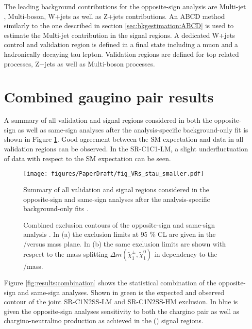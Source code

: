 The leading background contributions for the opposite-sign analysis are Multi-jet , Multi-boson, W+jets as well as Z+jets contributions. 
An ABCD method similarly to the one described in section \ref{sec:bkgestimation:ABCD} is used to estimate the Multi-jet contribution in the signal regions.  A dedicated W+jets control and validation region is defined in a final state including a muon and a hadronically decaying tau lepton.  Validation regions are defined for top related processes, Z+jets as well as Multi-boson processes. 

\section{Combined gaugino pair results}
\label{sec:analysis:combination}
A summary of all validation and signal regions considered in both the opposite-sign as well as same-sign analyses after the analysis-specific background-only fit is shown in Figure \ref{fig:analysis:osssregions}. Good agreement between the \ac{SM} expectation and data in all validation regions can be observed.  In the SR-C1C1-LM,  a slight underfluctuation of data with respect to the \ac{SM} expectation can be seen.

\begin{figure}[htpb!]
\centering
\texttt{[image: figures/PaperDraft/fig\_VRs\_stau\_smaller.pdf]}
\caption{Summary of all validation and signal regions considered in the opposite-sign and same-sign analyses after the analysis-specific background-only fits \label{fig:analysis:osssregions} \cite{DiTauConfNote2022}. }
\end{figure}

\begin{figure}[htpb!]\centering
{}
\caption{Combined exclusion contours of the opposite-sign and same-sign analysis \cite{DiTauConfNote2022}.  In (a) the exclusion limits at 95 \% \acs{CL} are given in the \Cone/\Ntwo versus \None mass plane.  In (b) the same exclusion limits are shown with respect to the mass splitting $\Delta m (\tilde{\chi}_1^\pm,\tilde{\chi}_1^0)$ in dependency to the \Cone/\Ntwo mass.}
\end{figure}

Figure \ref{fig:results:combination} shows the statistical combination of the opposite-sign and same-sign analyses.
Shown in green is the expected and observed contour of the joint SR-C1N2SS-LM and SR-C1N2SS-HM exclusion.  In blue  is given the opposite-sign analyses sensitivity to both the chargino pair as well as chargino-neutralino production as achieved in the (\Cone\Ntwo) signal regions. 

